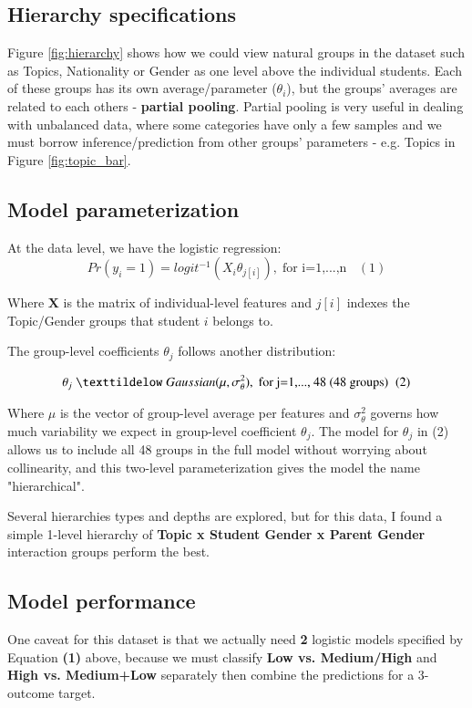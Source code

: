 \documentclass{sigchi}
\begin{document}
\subsection{Hierarchy specifications} 
Figure \ref{fig:hierarchy} shows how we could view natural groups in the dataset such as Topics, Nationality or Gender as one level above the individual students. Each of these groups has its own average/parameter ($\theta_{i}$), but the groups' averages are related to each others - \textbf{partial pooling}. Partial pooling is very useful in dealing with unbalanced data, where some categories have only a few samples and we must borrow inference/prediction from other groups' parameters - e.g. Topics in Figure \ref{fig:topic_bar}.


\subsection{Model parameterization} 
At the data level, we have the logistic regression:
\[ Pr(y_{i} = 1 ) = logit^{-1}(X_{i}\theta_{j[i]}),  \; \text{for i=1,...,n  } \; \; (1) \] 

Where $\mathbf{X}$ is the matrix of individual-level features and $j[i]$ indexes the Topic/Gender groups that student $i$ belongs to. 


The group-level coefficients $\theta_{j}$ follows another distribution:

\[ \theta_{j} \; \mathbf{\texttildelow} \; Gaussian(\mu, \sigma^2_{\theta}),  \; \text{for j=1,..., 48  (48 groups)}  \; \; (2)\] 

Where $\mu$ is the vector of group-level average per features and $\sigma^2_\theta$ governs how much variability we expect in group-level coefficient $\theta_{j}$. The model for $\theta_{j}$ in (2) allows us to include all 48 groups in the full model without worrying about collinearity, and this two-level parameterization gives the model the name "hierarchical".

Several hierarchies types and depths are explored, but for this data, I found a simple 1-level hierarchy of \textbf{Topic x Student Gender x Parent Gender} interaction groups perform the best.



\subsection{Model performance}
One caveat for this dataset is that we actually need \textbf{2} logistic models specified by Equation \textbf{(1)} above, because we must classify \textbf{Low vs. Medium/High} and \textbf{High vs. Medium+Low} separately then combine the predictions for a 3-outcome target.
\end{document}
